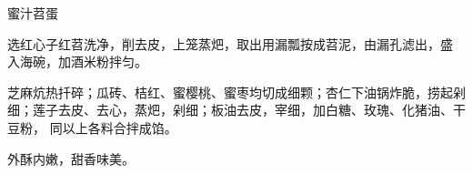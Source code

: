 \begin{recipe}[八宝苕蛋]{蜜汁苕蛋}

\ingredients


\preparation

\step 选红心子红苕洗净，削去皮，上笼蒸𤆵，取出用漏瓢按成苕泥，由漏孔滤出，盛
入海碗，加酒米粉拌匀。

\step 芝麻炕热扦碎；瓜砖、桔红、蜜樱桃、蜜枣均切成细颗；杏仁下油锅炸脆，捞起剁
细；莲子去皮、去心，蒸𤆵，剁细；板油去皮，宰细，加白糖、玫瑰、化猪油、干豆粉，
同以上各料合拌成馅。

\features

外酥内嫩，甜香味美。

\end{recipe}

